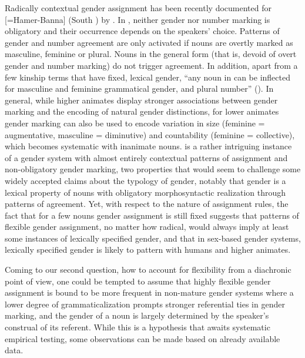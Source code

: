 \documentclass[output=collectionpaper]{langsci/langscibook}
\begin{document}
Radically contextual gender assignment has been recently documented for  [=Hamer-Banna] (South ) by \cite{Petrollino2016}. In , neither gender nor number marking is obligatory and their occurrence depends on the speakers' choice. Patterns of gender and number agreement are only activated if nouns are overtly marked as masculine, feminine or plural. Nouns in the general form (that is, devoid of overt gender and number marking) do not trigger agreement. In addition, apart from a few kinship terms that have fixed, lexical gender, ``any noun in  can be inflected for masculine and feminine grammatical gender, and plural number'' (\citealt[77]{Petrollino2016}). In general, while higher animates display stronger associations between gender marking and the encoding of natural gender distinctions, for lower animates gender marking can also be used to encode variation in size (feminine = augmentative, masculine = diminutive) and countability (feminine = collective), which becomes systematic with inanimate nouns.  is a rather intriguing instance of a gender system with almost entirely contextual patterns of assignment and non-obligatory gender marking, two properties that would seem to challenge some widely accepted claims about the typology of gender, notably that gender is a lexical property of nouns with obligatory morphosyntactic realization through patterns of agreement. Yet, with respect to the nature of assignment rules, the fact that for a few nouns gender assignment is still fixed suggests that patterns of flexible gender assignment, no matter how radical, would always imply at least some instances of lexically specified gender, and that in sex-based gender systems, lexically specified gender is likely to pattern with humans and higher animates.

Coming to our second question, how to account for flexibility from a diachronic point of view, one could be tempted to assume that highly flexible gender assignment is bound to be more frequent in non-mature gender systems where a lower degree of grammaticalization prompts stronger referential ties in gender marking, and the gender of a noun is largely determined by the speaker's construal of its referent. While this is a hypothesis that awaits systematic empirical testing, some observations can be made based on already available data.
\end{document}
